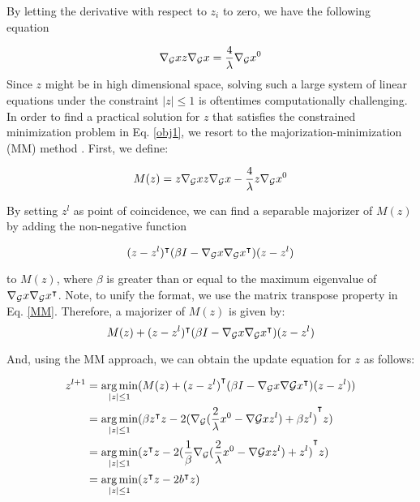 \documentclass{article}
\begin{document}
By letting the derivative with respect to $z_i$ to zero, we have the following equation

\begin{equation}
{\nabla _{\cal G}}{x}{z}{\nabla _{\cal G}}{x} = \frac{4}{\lambda }{\nabla _{\cal G}}x^0
\end{equation}
Since $z$ might be in high dimensional space, solving such a large system of linear equations under the constraint $|z| \le 1$ is oftentimes computationally challenging. In order to find a practical solution for $z$ that satisfies the constrained minimization problem in Eq. \ref{obj1}, we resort to the majorization-minimization (MM) method \cite{figueiredo2007majorization}. First, we define:

\begin{equation}
M({z}) =z {\nabla _{\cal G}}{x}{z}{\nabla _{\cal G}}{x} - \frac{4}{\lambda }{z}{\nabla _{\cal G}}x^0
\end{equation}

By setting $z^l$ as point of coincidence, we can find a separable majorizer of $M(z)$ by adding the non-negative function

\begin{equation}
\label{MM}
(z - {z^l})^\intercal(\beta I - \nabla_{\cal G} x\nabla_{\cal G} {x^\intercal})(z - {z^l})
\end{equation}

to $M(z)$, where $\beta$ is greater than or equal to the maximum eigenvalue of $\nabla_{\cal G} x\nabla_{\cal G} {x^\intercal}$. Note, to unify the format, we use the matrix transpose property in Eq. \ref{MM}. Therefore, a majorizer of $M(z)$ is given by:
\begin{equation}
M(z) + {(z - {z^l})^\intercal}(\beta I - \nabla_{\cal G} x\nabla_{\cal G} {x^\intercal})(z - {z^l})
\end{equation}

And, using the MM approach, we can obtain the update equation for $z$ as follows:

\begin{equation}
\label{iterative}
\begin{aligned}
\mathop {{z^{l + 1}}} &={\mathop { \arg \min }\limits_{\left| z \right| \le 1} } (M(z) + {{(z - {z^l})}^\intercal}(\beta I - {\nabla _{\cal G}}x{\nabla {\cal G}}{x^\intercal})(z - {z^l}))\\
&= {\mathop { \arg \min }\limits_{\left| z \right| \le 1} } (\beta {z^\intercal}z - 2{{({\nabla _{\cal G}}(\frac{2}{\lambda }{x^0} - {\nabla {\cal G}}x{z^l}) + \beta {z^l})}^\intercal}z)\\
&= {\mathop { \arg \min }\limits_{\left| z \right| \le 1} } ({z^\intercal}z - 2{{(\frac{1}{\beta }{\nabla _{\cal G}}(\frac{2}{\lambda }{x^0} - {\nabla {\cal G}}x{z^l}) + {z^l})}^\intercal}z)\\
&= {\mathop { \arg \min }\limits_{\left| z \right| \le 1} } ({z^\intercal}z - 2{b^\intercal}z)
\end{aligned}
\end{equation}
\end{document}
